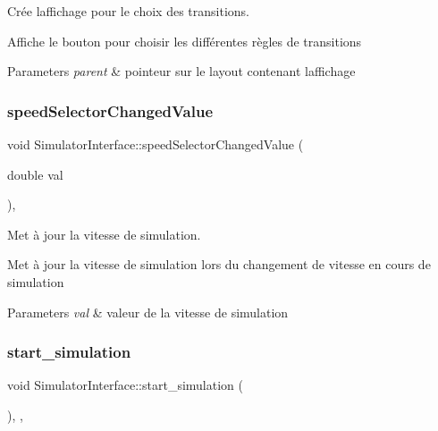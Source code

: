 Crée l\textquotesingle{}affichage pour le choix des transitions. 

Affiche le bouton pour choisir les différentes règles de transitions 
\begin{DoxyParams}{Parameters}
{\em parent} & pointeur sur le layout contenant l\textquotesingle{}affichage \\
\hline
\end{DoxyParams}
\mbox{\label{class_simulator_interface_aceb8d6280ea17cd906969841e8283153}} 
\subsubsection{\texorpdfstring{speed\+Selector\+Changed\+Value}{speedSelectorChangedValue}}
{\footnotesize\ttfamily void Simulator\+Interface\+::speed\+Selector\+Changed\+Value (\begin{DoxyParamCaption}\item[{double}]{val }\end{DoxyParamCaption})\hspace{0.3cm}{\ttfamily [protected]}, {\ttfamily [slot]}}



Met à jour la vitesse de simulation. 

Met à jour la vitesse de simulation lors du changement de vitesse en cours de simulation 
\begin{DoxyParams}{Parameters}
{\em val} & valeur de la vitesse de simulation \\
\hline
\end{DoxyParams}
\mbox{\label{class_simulator_interface_a1c0622490decde07945746cebf89f3c0}} 
\subsubsection{\texorpdfstring{start\+\_\+simulation}{start\_simulation}}
{\footnotesize\ttfamily void Simulator\+Interface\+::start\+\_\+simulation (\begin{DoxyParamCaption}{ }\end{DoxyParamCaption})\hspace{0.3cm}{\ttfamily [protected]}, {\ttfamily [virtual]}, {\ttfamily [slot]}}



